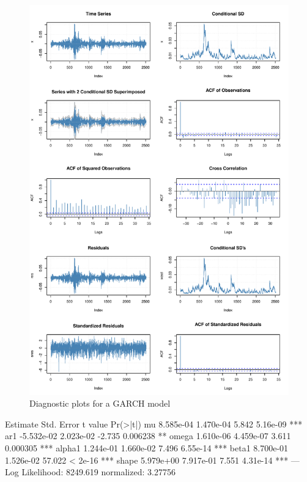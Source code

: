 \begin{figure}
\centering
\includegraphics[width=\textwidth]{figure38a.pdf}
\caption{Diagnostic plots for a GARCH model}
\label{fig:figure38a}
\end{figure}

\begin{samepage}
\begin{textcode}
         Estimate  Std. Error  t value Pr(>|t|)    
mu      8.585e-04   1.470e-04    5.842 5.16e-09 ***
ar1    -5.532e-02   2.023e-02   -2.735 0.006238 ** 
omega   1.610e-06   4.459e-07    3.611 0.000305 ***
alpha1  1.244e-01   1.660e-02    7.496 6.55e-14 ***
beta1   8.700e-01   1.526e-02   57.022  < 2e-16 ***
shape   5.979e+00   7.917e-01    7.551 4.31e-14 ***
---
Log Likelihood:
 8249.619    normalized:  3.27756 
\end{textcode}
\end{samepage}

